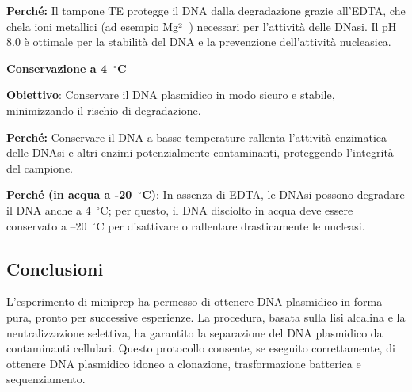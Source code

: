 \begin{enumerate}
\begin{noSplitBlock}
	      \begin{percheBox}
		      \textbf{Perché:} Il tampone TE protegge il DNA dalla degradazione grazie all'EDTA, che chela ioni metallici (ad esempio Mg²$^+$) necessari per l'attività delle DNasi. Il pH 8.0 è ottimale per la stabilità del DNA e la prevenzione dell'attività nucleasica.
	      \end{percheBox}
\end{noSplitBlock}
\begin{noSplitBlock}
	\item \textbf{Conservazione a 4~$^\circ$C}

	      {\footnotesize \textbf{Obiettivo}: Conservare il DNA plasmidico in modo sicuro e stabile, minimizzando il rischio di degradazione.}

	      \begin{percheBox}
		      \textbf{Perché:} Conservare il DNA a basse temperature rallenta l’attività enzimatica delle DNAsi e altri enzimi potenzialmente contaminanti, proteggendo l’integrità del campione.
	      \end{percheBox}

	      \begin{percheBox}
		      \textbf{Perché (in acqua a -20~$^\circ$C)}: In assenza di EDTA, le DNAsi possono degradare il DNA anche a 4~$^\circ$C; per questo, il DNA disciolto in acqua deve essere conservato a –20~$^\circ$C per disattivare o rallentare drasticamente le nucleasi.
	      \end{percheBox}
\end{noSplitBlock}
\end{enumerate}

\subsection{Conclusioni}

L’esperimento di miniprep ha permesso di ottenere DNA plasmidico in forma pura, pronto per successive esperienze. La procedura, basata sulla lisi alcalina e la neutralizzazione selettiva, ha garantito la separazione del DNA plasmidico da contaminanti cellulari. Questo protocollo consente, se eseguito correttamente, di ottenere DNA plasmidico idoneo a clonazione, trasformazione batterica e sequenziamento.
\newpage
